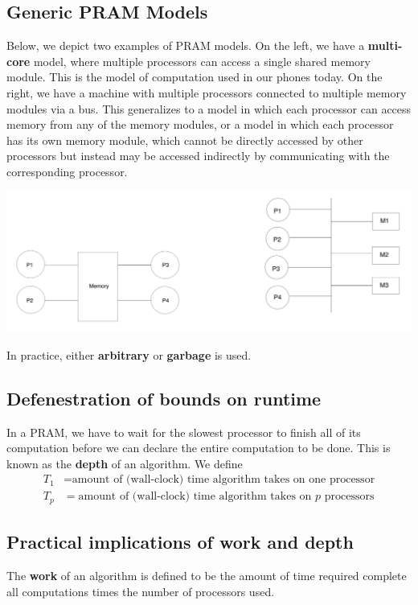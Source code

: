 \documentclass[11pt]{article}
\begin{document}
\subsection{Generic PRAM Models}
\label{sec:org4d37aab}
Below, we depict two examples of PRAM models. On the left, we have a \textbf{multi-core} model, where
multiple processors can access a single shared memory module. This is the model of computation
used in our phones today. On the right, we have a machine with multiple processors connected to
multiple memory modules via a bus. This generalizes to a model in which each processor can
access memory from any of the memory modules, or a model in which each processor has its own
memory module, which cannot be directly accessed by other processors but instead may be accessed
indirectly by communicating with the corresponding processor.
\begin{center}
\includegraphics[width=.8\textwidth]{../images/cme323/1.png}
\label{Examples of PRAM}
\end{center}

In practice, either \textbf{arbitrary} or \textbf{garbage} is used.
\subsection{Defenestration of bounds on runtime}
\label{sec:org5772b28}
In a PRAM, we have to wait for the slowest processor to finish all of its computation before we
can declare the entire computation to be done. This is known as the \textbf{depth} of an algorithm. We
define
 \begin{align*}
T_1&=\text{amount of (wall-clock) time algorithm takes on one processor}\\
T_p&=\text{amount of (wall-clock) time algorithm takes on \(p\) processors}
 \end{align*}
\subsection{Practical implications of work and depth}
\label{sec:org28661e8}
\begin{definition}[Work]
The \textbf{work} of an algorithm is defined to be the amount of time required complete all computations
times the number of processors used.
\end{definition}
\end{document}
